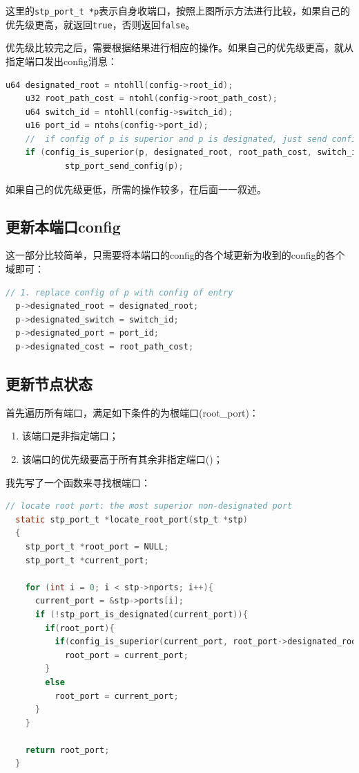 \documentclass[UTF8]{report}
\begin{document}
这里的\texttt{stp_port_t *p}表示自身收端口，按照上图所示方法进行比较，如果自己的优先级更高，就返回\texttt{true}，否则返回\texttt{false}。

优先级比较完之后，需要根据结果进行相应的操作。如果自己的优先级更高，就从指定端口发出config消息：

\begin{lstlisting}[language=C]
	u64 designated_root = ntohll(config->root_id);
	u32 root_path_cost = ntohl(config->root_path_cost);
	u64 switch_id = ntohll(config->switch_id);
	u16 port_id = ntohs(config->port_id);
	//  if config of p is superior and p is designated, just send config
	if (config_is_superior(p, designated_root, root_path_cost, switch_id, port_id) && stp_port_is_designated(p))
			stp_port_send_config(p);
\end{lstlisting}

如果自己的优先级更低，所需的操作较多，在后面一一叙述。

\subsection{更新本端口config}

这一部分比较简单，只需要将本端口的config的各个域更新为收到的config的各个域即可：

\begin{lstlisting}[language=C]
  // 1. replace config of p with config of entry
  p->designated_root = designated_root;
  p->designated_switch = switch_id;
  p->designated_port = port_id;
  p->designated_cost = root_path_cost;
\end{lstlisting}

\subsection{更新节点状态}

首先遍历所有端口，满足如下条件的为根端口(root\_port)：

\begin{enumerate}
  \item 该端口是非指定端口；
  \item 该端口的优先级要高于所有其余非指定端口()；
\end{enumerate}

我先写了一个函数来寻找根端口：

\begin{lstlisting}[language=C]
  // locate root port: the most superior non-designated port
  static stp_port_t *locate_root_port(stp_t *stp)
  {
    stp_port_t *root_port = NULL;
    stp_port_t *current_port;
  
    for (int i = 0; i < stp->nports; i++){
      current_port = &stp->ports[i];
      if (!stp_port_is_designated(current_port)){
        if(root_port){
          if(config_is_superior(current_port, root_port->designated_root, root_port->designated_cost, root_port->designated_switch, root_port->port_id))
            root_port = current_port;
        }
        else
          root_port = current_port;
      }
    }
        
    return root_port;
  }
\end{lstlisting}
\end{document}
